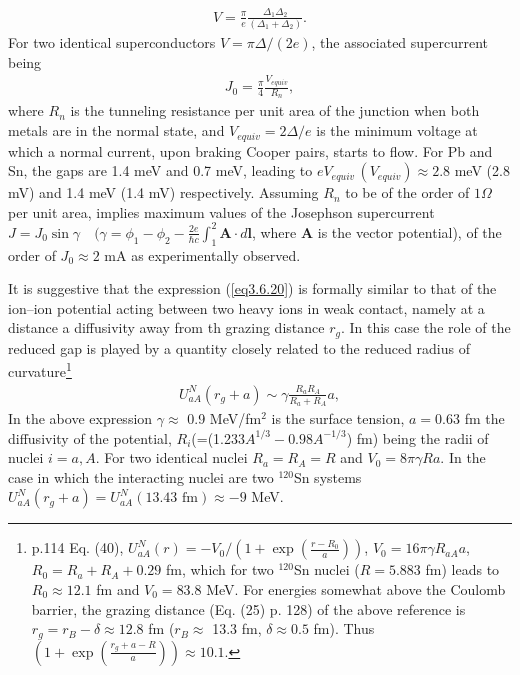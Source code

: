 \begin{align}\label{eq3.6.20}
V=\frac{\pi}{e}\frac{\Delta_1\Delta_2}{(\Delta_1+\Delta_2)}.
\end{align}
For two identical superconductors $V=\pi\Delta/(2e)$, the associated supercurrent being
\begin{align}
J_0=\frac{\pi}{4}\frac{V_{equiv}}{R_n},
\end{align}
 where $R_n$ is the tunneling resistance per unit area of the junction when both metals are in the normal state, and $V_{equiv}=2\Delta/e$ is the minimum voltage at which a normal current, upon braking Cooper pairs, starts to flow. For Pb and Sn, the gaps are 1.4 meV and 0.7 meV, leading to $e V_{equiv} \,(V_{equiv})\approx 2.8$ meV (2.8 mV) and 1.4 meV (1.4 mV) respectively. Assuming $R_n$ to be of the order of $1\Omega$ per unit area, implies maximum values of the Josephson supercurrent $J=J_0\sin\gamma\quad(\gamma=\phi_1-\phi_2-\frac{2e}{\hbar c}\int^2_1\mathbf A\cdot d\mathbf l$, where $\mathbf A$ is the vector potential), of the order of $J_0\approx 2$ mA as experimentally observed.
 
 
 It is suggestive that the expression (\ref{eq3.6.20}) is formally similar to that of the ion--ion potential acting between two heavy ions in weak contact, namely at a distance  a diffusivity away from th grazing distance $r_g$. In this case the role of the reduced gap is played by a quantity closely related to the reduced radius of curvature\footnote{\cite{Broglia:04a} p.114  Eq. (40), $U_{aA}^{N}(r)=-V_0/(1+\exp(\frac{r-R_0}{a}))$, $V_0=16\pi\gamma R_{aA}a$, $R_0=R_a+R_A+0.29$ fm, which for two $^{120}$Sn nuclei ($R=5.883$ fm) leads to $R_0\approx12.1$ fm and $V_0=83.8$ MeV. For energies somewhat above the Coulomb barrier, the grazing distance (Eq. (25) p. 128) of the above reference is $r_g=r_B-\delta\approx12.8$ fm ($r_B\approx$ 13.3 fm, $\delta\approx0.5$ fm). Thus $(1+\exp(\frac{r_g+a-R}{a}))\approx10.1$.}
 \begin{align}\label{eq3.6.22}
 U_{aA}^N(r_g+a)\sim \gamma\frac{R_aR_A}{R_a+R_A}a,
 \end{align}
 In the above expression $\gamma\approx$ 0.9 MeV/fm$^2$ is the surface tension, $a=0.63$ fm the diffusivity of the potential, $R_i$(=(1.233$A^{1/3}-0.98A^{-1/3}$) fm) being the radii of nuclei $i=a,A$. For two identical nuclei $R_a=R_A=R$ and $V_0=8\pi\gamma R a$. In the case in which the interacting nuclei are two  $^{120}$Sn systems  $U_{aA}^N(r_g+a)=U_{aA}^N(13.43 \text{ fm})\approx-9$ MeV.
 
 
 
